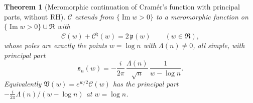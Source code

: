 \documentclass[11pt,a4paper]{article}
\numberwithin{equation}{section}
\newtheorem{theorem}{Theorem}[section]
\theoremstyle{definition}
\theoremstyle{remark}
\begin{document}
\begin{theorem}[Meromorphic continuation of Cram\'er's function with principal parts, without RH]\label{thm:v17-cont}
$\mathscr C$ extends from $\{\operatorname{Im}w>0\}$ to a meromorphic function on $\{\operatorname{Im}w>0\}\cup\mathfrak R$ with
\begin{equation}
\mathscr C(w)+\mathscr C^\natural(w)=2\,\mathfrak p(w)\qquad(w\in\mathfrak R),
\end{equation}
whose poles are exactly the points $w=\log n$ with $\Lambda(n)\ne0$, all simple, with principal part
\begin{equation}\label{eq:v17-pp}
\mathfrak s_n(w)=-\frac{i}{2\pi}\,\frac{\Lambda(n)}{\sqrt n}\,\frac1{w-\log n}.
\end{equation}
Equivalently $\mathfrak V(w)=e^{w/2}\mathscr C(w)$ has the principal part $-\frac{i}{2\pi}\Lambda(n)/(w-\log n)$ at $w=\log n$.
\end{theorem}
\end{document}
